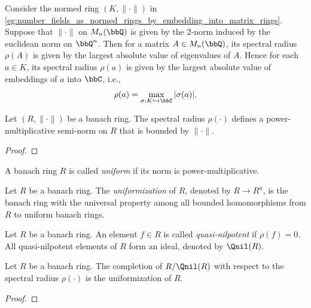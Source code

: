    \begin{example}\label{eg:spectral_radius_normed_rings_number_fields_by_embedding_into_matrix_rings}
        Consider the normed ring \((K, \|\cdot\|)\) in \cref{eg:number_fields_as_normed_rings_by_embedding_into_matrix_rings}.
        Suppose that \(\|\cdot\|\) on \(M_n(\bbQ)\) is given by the \(2\)-norm induced by the euclidean norm on \(\bbQ^n\).
        Then for a matrix \(A \in M_n(\bbQ)\), its spectral radius \(\rho(A)\) is given by the largest absolute value of eigenvalues of \(A\).
        Hence for each \(a \in K\), its spectral radius \(\rho(a)\) is given by the largest absolute value of embeddings of \(a\) into \(\bbC\), i.e.,
        \[
            \rho(a) = \max_{\sigma: K \hookrightarrow \bbC} |\sigma(a)|.
        \]
    \end{example}

    \begin{proposition}\label{prop:spectral_radius_defines_a_power-multiplicative_semi-norm}
        Let \((R,\|\cdot\|)\) be a banach ring.
        The spectral radius \(\rho(\cdot)\) defines a power-multiplicative semi-norm on \(R\) that is bounded by \(\|\cdot\|\).
    \end{proposition}
    \begin{proof}
    \end{proof}
    
    \begin{definition}\label{def:uniform_banach_ring}
        A banach ring \(R\) is called \emph{uniform} if its norm is power-multiplicative.
    \end{definition}

    \begin{definition}\label{def:uniformization_of_banach_rings}
        Let \(R\) be a banach ring.
        The \emph{uniformization} of \(R\), denoted by \(R \to R^u\), is the banach ring with the universal property among all bounded homomorphisms from \(R\) to uniform banach rings.
    \end{definition}

    \begin{definition}\label{def:quasi_nilpotent_element}
        Let \(R\) be a banach ring.
        An element \(f \in R\) is called \emph{quasi-nilpotent} if \(\rho(f) = 0\).
        All quasi-nilpotent elements of \(R\) form an ideal, denoted by \(\Qnil(R)\).
    \end{definition}

    \begin{proposition}\label{prop:the_uniformization_of_banach_rings_given_by_spectral_radius}
        Let \(R\) be a banach ring.
        The completion of \(R/\Qnil(R)\) with respect to the spectral radius \(\rho(\cdot)\) is the uniformization of \(R\).
    \end{proposition}
    \begin{proof}
    \end{proof}

